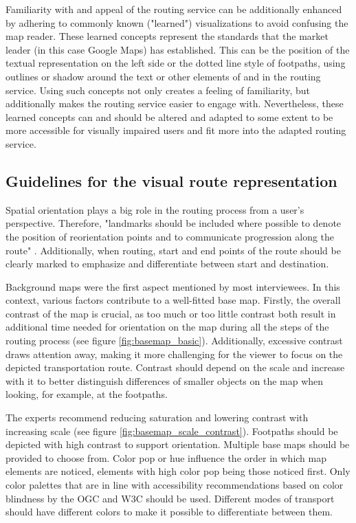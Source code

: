 \documentclass[agile, final]{copernicus-agile}
\begin{document}
Familiarity with and appeal of the routing service can be additionally enhanced by adhering to commonly known ("learned") visualizations to avoid confusing the map reader. These learned concepts represent the standards that the market leader (in this case Google Maps) has established. This can be the position of the textual representation on the left side or the dotted line style of footpaths, using outlines or shadow around the text or other elements of and in the routing service. Using such concepts not only creates a feeling of familiarity, but additionally makes the routing service easier to engage with. Nevertheless, these learned concepts can and should be altered and adapted to some extent to be more accessible for visually impaired users and fit more into the adapted routing service.

\subsection{Guidelines for the visual route representation}

Spatial orientation plays a big role in the routing process from a user's perspective. Therefore, "landmarks should be included where possible to denote the position of reorientation points and to communicate progression along the route" \citep{AgrawalaStolte2000}. Additionally, when routing, start and end points of the route should be clearly marked to emphasize and differentiate between start and destination.

Background maps were the first aspect mentioned by most interviewees. In this context, various factors contribute to a well-fitted base map. Firstly, the overall contrast of the map is crucial, as too much or too little contrast both result in additional time needed for orientation on the map during all the steps of the routing process (see figure \ref{fig:basemap_basic}). Additionally, excessive contrast draws attention away, making it more challenging for the viewer to focus on the depicted transportation route. Contrast should depend on the scale and increase with it to better distinguish differences of smaller objects on the map when looking, for example, at the footpaths. 

The experts recommend reducing saturation and lowering contrast with increasing scale (see figure \ref{fig:basemap_scale_contrast}). Footpaths should be depicted with high contrast to support orientation. Multiple base maps should be provided to choose from. Color pop or hue influence the order in which map elements are noticed, elements with high color pop being those noticed first. Only color palettes that are in line with accessibility recommendations based on color blindness by the OGC and W3C should be used. Different modes of transport should have different colors to make it possible to differentiate between them.
\end{document}
